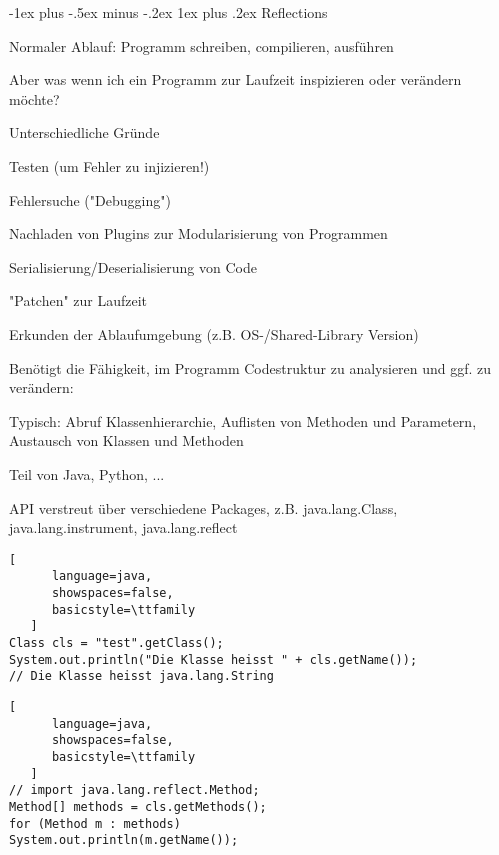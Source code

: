\documentclass[10pt]{article}
\makeatletter
\renewcommand{\subsubsection}{\@startsection{subsubsection}{3}{0mm}%
                                {-1ex plus -.5ex minus -.2ex}%
                                {1ex plus .2ex}%
                                {\normalfont\small\bfseries}}
\makeatother
\begin{document}
\subsubsection{Reflections}
\begin{itemize*}
  \item Normaler Ablauf: Programm schreiben, compilieren, ausführen
  \begin{itemize*}
    \item Aber was wenn ich ein Programm zur Laufzeit inspizieren oder verändern möchte?
  \end{itemize*}
  \item Unterschiedliche Gründe
  \begin{itemize*}
    \item Testen (um Fehler zu injizieren!)
    \item Fehlersuche ("Debugging")
    \item Nachladen von Plugins zur Modularisierung von Programmen
    \item Serialisierung/Deserialisierung von Code
    \item "Patchen" zur Laufzeit
    \item Erkunden der Ablaufumgebung (z.B. OS-/Shared-Library Version)
  \end{itemize*}
  \item Benötigt die Fähigkeit, im Programm Codestruktur zu analysieren und ggf. zu verändern:
  \begin{itemize*}
    \item Typisch: Abruf Klassenhierarchie, Auflisten von Methoden und Parametern, Austausch von Klassen und Methoden
    \item Teil von Java, Python, ...
  \end{itemize*}
\end{itemize*}

API verstreut über verschiedene Packages, z.B. java.lang.Class, java.lang.instrument, java.lang.reflect

\begin{lstlisting}[
      language=java,
      showspaces=false,
      basicstyle=\ttfamily
   ]
Class cls = "test".getClass();
System.out.println("Die Klasse heisst " + cls.getName());
// Die Klasse heisst java.lang.String
\end{lstlisting}

\begin{lstlisting}[
      language=java,
      showspaces=false,
      basicstyle=\ttfamily
   ]
// import java.lang.reflect.Method;
Method[] methods = cls.getMethods();
for (Method m : methods)
System.out.println(m.getName());
\end{lstlisting}
\end{document}
